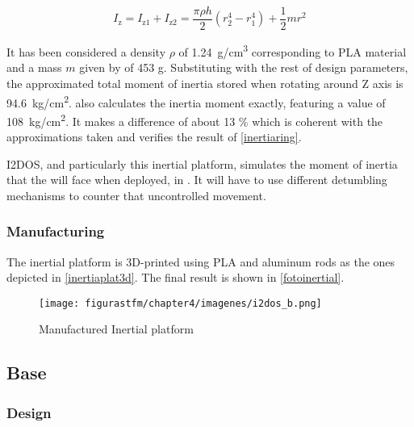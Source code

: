 \begin{equation} \label{inertiaring}
I_{\text{z}}=I_{\text{z}1}+I_{\text{z}2}=\frac{\pi\rho h}{2}(r^{4}_{2}-r^{4}_{1})+\frac{1}{2}mr^{2}
\end{equation}

It has been considered a density $\rho$ of \SI{1.24}{g/cm^3} corresponding to \acrshort{PLA} material and a mass $m$ given by  of 453 g.  Substituting with the rest of design parameters, the approximated total moment of inertia stored when rotating around Z axis is \SI{94.6}{kg/cm^2}.  also calculates the inertia moment exactly, featuring a value of  \SI{108}{kg/cm^2}. It makes a difference of about 13 \% which is coherent with the approximations taken and verifies the result of \autoref{inertiaring}.

\acrshort{I2DOS}, and particularly this inertial platform, simulates the moment of inertia that the  will face when deployed, in . It will have to use different detumbling mechanisms to counter that uncontrolled movement.

			\vspace{-0.5cm}


\subsubsection{Manufacturing}

The inertial platform is 3D-printed using \acrshort{PLA} and aluminum rods as the ones depicted in \autoref{inertiaplat3d}. The final result is shown in \autoref{fotoinertial}.

\vspace{-0.3cm}
\begin{figure}[H]
			\centering
			\texttt{[image: figurastfm/chapter4/imagenes/i2dos\_b.png]}
			\caption{Manufactured Inertial platform} \label{fotoinertial} 
			\vspace{-2cm}
\end{figure}

\subsection{Base}

\subsubsection{Design}

